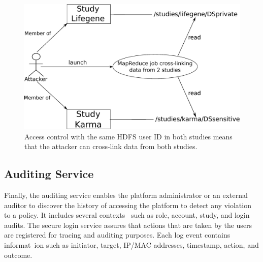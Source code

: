 \begin{figure}[h]
 \centering
 \includegraphics[scale=0.3]{./imgs/studyIsolation.eps}
	\caption{Access control with the same HDFS user ID in both studies means that the attacker can cross-link data from both studies.}
	\label{fig:ac:problem:isolation}
\end{figure}




\subsection {Auditing Service}
Finally, the auditing service enables the platform administrator or an external auditor to discover the history of accessing the platform to detect any violation to a policy. It includes several contexts \
such as role, account, study, and login audits. The secure login service assures that actions that are taken by the users are registered for tracing and auditing purposes. Each log event contains informat\
ion such as initiator, target, IP/MAC addresses, timestamp, action, and outcome.
